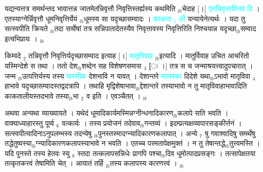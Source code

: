 \documentclass[article,12pt,a4paper]{memoir}%
\newcommand{\quotelemma}[1]{\textcolor{cyan}{#1}}
\newcounter{parCount}
\begin{document}
	  
	  \pstart \leavevmode%
	 \leavevmode{}यद्यन्यत्तत्र समर्थन्तद भावात्तन्न जातमेतन्निवृत्तौ निवृत्तिस्तर्ह्यस्य कथमिति {\tiny $_{lb}$}चेदाह [।] \quotelemma{एतन्निवृत्तावित्या \cite[2a5]{vn-msN} दि} । एतस्याग्नेर्न्निवृत्तौ धूमनिवृत्तिर्येयं {\tiny $_{lb}$}धूमस्य सा यदृच्छासम्वादः । \quotelemma{काकता {\tiny $_{1}$} ली} यन्यायेनेत्यर्थः । यदा तु सत्स्वपीति क्रियते {\tiny $_{lb}$}तदा सर्व्वेषां तत्र सन्निपातादेतस्यैव निवृत्तावस्य निवृत्तिरिति निश्चयान्न यदृच्छा{\tiny $_{lb}$}सम्वाद इत्यभिप्रायः ।
	{}
	\pend%
      {\tiny $_{lb}$}

	  
	  \pstart \leavevmode%
	किम्वदे {\tiny $_{2}$} तन्निवृत्तौ निवृत्तिर्यदृच्छासम्वाद इत्याह [।] \quotelemma{मातृविवाह} \cite[2a5]{vn-msN} {\tiny $_{lb}$}इत्यादि । मातुर्विवाह उचित आचरितो यस्मिन्देशे स तथा । ततो देश{\tiny $_{lb}$}शब्देन सह विशेषणसमास {\tiny $_{3}$} [ः ।] तत्र स च जन्माश्रयत्त्वादुपचारात् । जन्म {\tiny $_{lb}$}उत्पत्तिर्यस्य तस्य \quotelemma{पारसीक} देशभावि न यावत् । देशान्तरे \quotelemma{मालवका} दिदेशे यथा{\tiny $_{lb}$}ऽभावो मातृविवा {\tiny $_{4}$} हाभावे यदृच्छासम्वादस्तद्वदत्रापि । तथाहि मृद्विशेषाभावा{\tiny $_{lb}$}द्देशान्तरे तस्याभावो न तु मातृविवाहाभावादिति काकतालीयस्तदभावे तस्या{\tiny $_{lb}$}भा {\tiny $_{2}$} व इति । एवञ्चैतत् ।
	{}
	\pend%
      {\tiny $_{lb}$}

	  
	  \pstart \leavevmode%
	अथवा अन्यथा व्याख्यायते । यथेदं धूमादिकार्यमस्मिन्नग्नीन्धनादिकारण{\tiny $_{lb}$}कलापे सति भवति । वाक्याध्याहारस्तु पूर्व्व {\tiny $_{6}$} वत्कार्यः । तस्य प्रयोजनं तदेवाव{\tiny $_{lb}$}गन्तव्यं । इदम्प्रत्यक्षव्यापारसङ्कीर्त्तनं । सत्स्वपीत्यादिनाऽनुपलम्भस्य तदन्येषु {\tiny $_{lb}$}पुनस्तस्मादग्न्यादिकारणकलापात् । अन्ये {\tiny $_{7}$} षु गवाश्वादिषु समर्थेषु तद्धेतुष्वस्या{\tiny $_{lb}$}ग्न्यादिकारणकलापस्याभावे न भवति । एतच्च परमतापेक्षमुक्तं । न तु तेषान्तद्धे{\tiny $_{lb}$}तुत्त्वमस्ति । यदि पुनस्ते तस्य हेतवः स्यु {\tiny $_{8}$} स्तदा तत्कलापसन्निधेः प्रागपि पश्चा{\tiny $_{lb}$}दिव धूमोत्पादप्रसङ्गः । तत्सापेक्षतया तत्कृतकत्त्वं तेषामिति चेत् । आयातं तर्हि {\tiny $_{lb}$}तस्य कलापस्य कारणत्त्वं ।
	{}
	\pend%
      {\tiny $_{lb}$}
\end{document}
